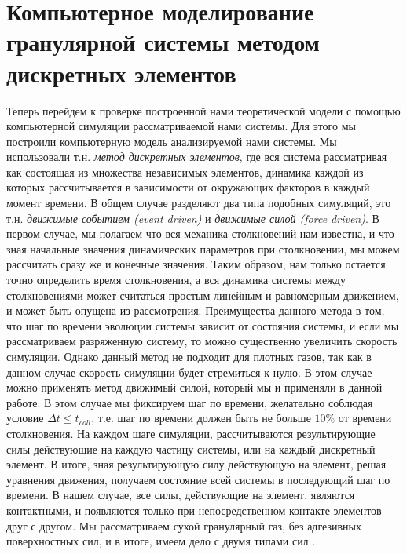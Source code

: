 \chapter{Компьютерное моделирование гранулярной системы методом дискретных элементов}
\label{cha:research}

Теперь перейдем к проверке построенной нами теоретической модели с помощью компьютерной симуляции рассматриваемой нами системы.
Для этого мы построили компьютерную модель анализируемой нами системы. Мы использовали т.н. \emph{метод дискретных элементов},
где вся система рассматривая как состоящая из множества независимых элементов, динамика каждой из которых рассчитывается 
в зависимости от окружающих факторов в каждый момент времени. В общем случае разделяют два типа подобных симуляций,
это т.н. \emph{движимые событием (event driven)} и \emph{движимые силой (force driven)}. В первом случае, мы полагаем что
вся механика столкновений нам известна, и что зная начальные значения динамических параметров при столкновении, мы можем 
рассчитать сразу же и конечные значения. Таким образом, нам только остается точно определить время столкновения, а вся
динамика системы между столкновениями может считаться простым линейным и равномерным движением, и может быть опущена из рассмотрения.
Преимущества данного метода в том, что шаг по времени эволюции системы зависит от состояния системы, и если мы рассматриваем
разряженную систему, то можно существенно увеличить скорость симуляции. Однако данный метод не подходит для плотных газов,
так как в данном случае скорость симуляции будет стремиться к нулю. В этом случае можно применять метод движимый силой, 
который мы и применяли в данной работе. В этом случае мы фиксируем шаг по времени, желательно соблюдая условие $\Delta t\leq t_{coll}$,
т.е. шаг по времени должен быть не больше $10\%$ от времени столкновения. На каждом шаге симуляции, рассчитываются результирующие 
силы действующие на каждую частицу системы, или на каждый дискретный элемент. В итоге, зная результирующую силу действующую на 
элемент, решая уравнения движения, получаем состояние всей системы в последующий шаг по времени. В нашем случае, все силы,
действующие на элемент, являются контактными, и появляются только при непосредственном контакте элементов друг с другом.
Мы рассматриваем сухой гранулярный газ, без адгезивных поверхностных сил, и в итоге, имеем дело с двумя типами сил 
\cite{Salo:2010icarus_N_body,Schaefer:1996jphys_force_schemes,Cuendet:2007jchem_md_simul,Lois:2007pre_shear_flow,
Brilliantov:2007pre_coll_dyn,Brilliantov:2007pre_coll_adh,Quinn:2010astro_hill_simplectic}. 

